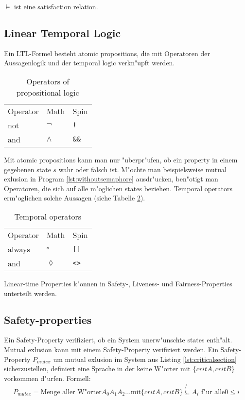 \documentclass[11pt,twoside,a4paper]{article}
\begin{document}
$ \models $ ist eine satisfaction relation. 


\subsection{Linear Temporal Logic}
\label{sec:lineartemporallogic}


Ein LTL-Formel besteht atomic propositions, die mit Operatoren der Aussagenlogik  und der temporal logic verkn"upft werden.


\begin{table}
  \centering

  \begin{tabular}{l l l}
    Operator & Math & Spin \\
    not & $\neg$ & \verb|!| \\
    and & $\land$ & \verb|&&| \\
  \end{tabular}
  \caption{Operators of propositional logic }
  \label{tab:operators_of_propositionallogic}
\end{table}

Mit atomic propositions kann man nur "uberpr"ufen, ob ein property in einem gegebenen state $s$ wahr oder falsch ist. M"ochte man beispielsweise mutual exlusion in Program \ref{lst:withoutsemaphore} ausdr"ucken, ben"otigt man Operatoren, die sich auf alle m"oglichen states beziehen. Temporal operators erm"oglichen solche Aussagen (siehe Tabelle \ref{tab:temporal_operators}). 

\begin{table}
  \centering
  \begin{tabular}{l l l}
    Operator & Math & Spin \\
    always & $\square$ & \verb|[]| \\
    and & $\lozenge$ & \verb|<>| \\
  \end{tabular}
  \caption{Temporal operators }
  \label{tab:temporal_operators}
\end{table}



Linear-time Properties k"onnen in Safety-, Liveness- und Fairness-Properties unterteilt werden.

\subsection{Safety-properties}
\label{sec:safety}

Ein Safety-Property verifiziert, ob ein System unerw"unschte states enth"alt. Mutual exlusion kann mit einem Safety-Property verifiziert werden. Ein Safety-Property $P_{mutex}$ um mutual exlusion im System aus Listing \ref{lst:criticalsection} sicherzustellen, definiert eine Sprache in der keine W"orter mit $\{critA,critB\}$ vorkommen d"urfen. Formell:
\[
P_{mutex} = \text{Menge aller W"orter} A_0 A_1 A_2 \dots \text{mit} \{critA,critB\} \not{\subseteq} A_i \text{ f"ur alle} 0 \leq i
\]
\end{document}

